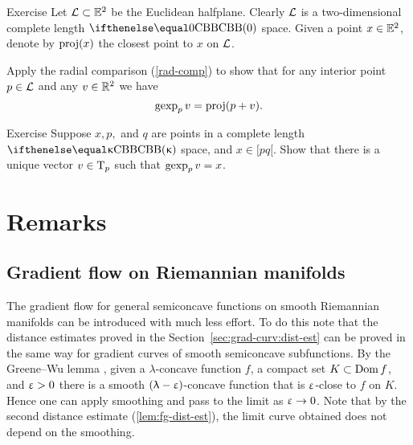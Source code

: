 \begin{thm}{Exercise}\label{ex:gexp} 
Let $\spc{L}\subset\EE^2$ be the Euclidean halfplane. 
Clearly $\mathcal{L}$ is a two-dimensional complete length $\Alex{0}$ space.
Given a point $x\in \EE^2$, denote by $\mathop{\rm proj}\nolimits(x)$ the closest point to $x$ on $\mathcal{L}$. 

Apply the radial comparison (\ref{rad-comp}) to show that for any interior point $p\in \spc{L}$ and any $v\in\R^2$  we have 
\[\mathop{\rm gexp}\nolimits_p v=\mathop{\rm proj}\nolimits(p+v).\]
\end{thm}

\begin{thm}{Exercise}\label{ex:inv-gexp}
Suppose $x,p,$ and $q$ are points in a complete length $\Alex\kappa$ space, and $x\in [pq[$.
Show that there is a unique vector $v\in\T_p$ such that $\mathop{\rm gexp}\nolimits_p v=x$.
\end{thm}

%


\section{Remarks}

\subsection*{Gradient flow on Riemannian manifolds}
The gradient flow for general semiconcave functions 
on smooth Riemannian manifolds  can be introduced with much less effort.
To do this note that the distance estimates proved in the Section~\ref{sec:grad-curv:dist-est}
can be proved in the same way for gradient curves of smooth semiconcave subfunctions.
By the Greene--Wu lemma \cite{greene-wu}, 
given 
a $\lambda$-concave function $f$, 
a compact set $K\subset \Dom f$,
and $\upvarepsilon>0$
there is a smooth $(\uplambda-\upvarepsilon)$-concave function that is 
$\upvarepsilon$-close to $f$ on $K$.
Hence one can apply smoothing and pass to the limit as $\eps\to0$.
Note that by the second distance  estimate (\ref{lem:fg-dist-est}), the  limit curve obtained does not depend on the smoothing.

